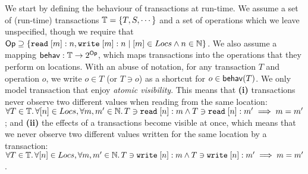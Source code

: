 \documentclass[a4paper,UKenglish]{article}%
\theoremstyle{plain}
\begin{document}
We start by defining the behaviour of transactions at run-time. 
We assume a set of (run-time) transactions $\mathbb{T} = \{T, S , \cdots \}$ 
and a set of operations which we leave unspecified, though 
we require that $\mathsf{Op} \supseteq \{ {{\tt read}}\;[m]:n,{{\tt write}}\;[m]:n \mid [m] \in Locs \wedge n \in \mathbb{N} \}$.
We also assume a mapping $\mathsf{behav} : \mathbb{T} \rightarrow 2^{\mathsf{Op}}$, which maps 
transactions into the operations that they perform on locations. With an abuse of 
notation, for any transaction $T$ and operation $o$, we write $o \in T$ (or $T \ni o$) as 
a shortcut for $o \in \mathsf{behav}(T)$. 
We only model transaction that enjoy \emph{atomic visibility}. This 
means that \textbf{(i)} transactions never observe two different values when reading from 
the same location: $\forall T \in \mathbb{T}.\, \forall [n] \in Locs, \forall m,m' \in \mathbb{N}.\, 
T \ni {{\tt read}}\;[n]:m \wedge T \ni {{\tt read}}\;[n]:m' \implies m = m'$; and \textbf{(ii)} 
the effects of a transactions become visible at once, which means that we never observe
two different values written for the same location by a transaction: $\forall T \in \mathbb{T}.\, 
\forall [n] \in Locs, \forall m,m' \in \mathbb{N}.\, T \ni {{\tt write}}\;[n]: m \wedge T \ni {{\tt write}}\;[n]:m' 
\implies m = m'$.
\end{document}
